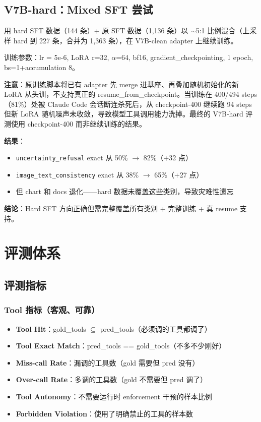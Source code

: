 \documentclass[12pt,a4paper]{ctexart}
\begin{document}
\subsection{V7B-hard：Mixed SFT 尝试}

用 hard SFT 数据（144 条）+ 原 SFT 数据（1,136 条）以 $\sim$5:1 比例混合（上采样 hard 到 227 条，合并为 1,363 条），在 V7B-clean adapter 上继续训练。

训练参数：lr = 5e-6, LoRA r=32, $\alpha$=64, bf16, gradient\_checkpointing, 1 epoch, bs=1+accumulation 8。

\textbf{注意}：原训练脚本将已有 adapter 先 merge 进基座、再叠加随机初始化的新 LoRA 从头训，不支持真正的 resume\_from\_checkpoint。当训练在 400/494 steps（81\%）处被 Claude Code 会话断连杀死后，从 checkpoint-400 继续跑 94 steps 但新 LoRA 随机噪声未收敛，导致模型工具调用能力洗掉。最终的 V7B-hard 评测使用 checkpoint-400 而非继续训练的结果。

\textbf{结果}：
\begin{itemize}[nosep]
  \item \texttt{uncertainty\_refusal} exact 从 50\% $\rightarrow$ 82\%（+32 点）
  \item \texttt{image\_text\_consistency} exact 从 38\% $\rightarrow$ 65\%（+27 点）
  \item 但 chart 和 docs 退化——hard 数据未覆盖这些类别，导致灾难性遗忘
\end{itemize}

\textbf{结论}：Hard SFT 方向正确但需完整覆盖所有类别 + 完整训练 + 真 resume 支持。

\section{评测体系}

\subsection{评测指标}

\subsubsection{Tool 指标（客观、可靠）}

\begin{itemize}[nosep]
  \item \textbf{Tool Hit}：gold\_tools $\subseteq$ pred\_tools（必须调的工具都调了）
  \item \textbf{Tool Exact Match}：pred\_tools == gold\_tools（不多不少刚好）
  \item \textbf{Miss-call Rate}：漏调的工具数（gold 需要但 pred 没有）
  \item \textbf{Over-call Rate}：多调的工具数（gold 不需要但 pred 调了）
  \item \textbf{Tool Autonomy}：不需要运行时 enforcement 干预的样本比例
  \item \textbf{Forbidden Violation}：使用了明确禁止的工具的样本数
\end{itemize}
\end{document}
